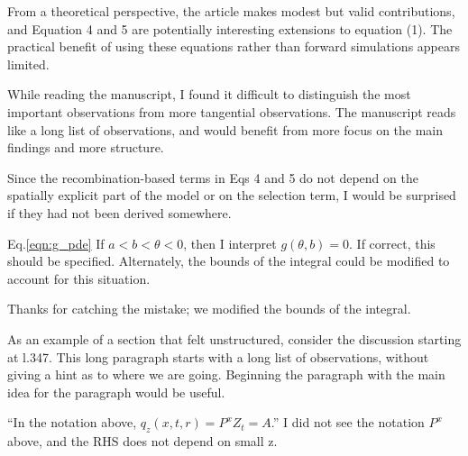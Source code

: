 \begin{point}{}
    From a theoretical perspective, the article makes modest but valid contributions, and  Equation 4 and 5 are potentially interesting extensions to equation (1). The practical benefit of using these equations rather than forward simulations appears limited.
\end{point}

\reply
{}

\begin{point}{}
    While reading the manuscript, I found it difficult to distinguish the most important observations from more tangential observations. The manuscript reads like a long list of observations, and would benefit from more focus on the main findings and more structure.
\end{point}

\reply

\begin{point}{}
Since the recombination-based terms in Eqs 4 and 5 do not depend on the spatially explicit part of the model or on the selection term, I would be surprised if they had not been derived somewhere.
\end{point}

\reply
{}

\begin{point}{Eq.\ref{eqn:g_pde}}
If $a<b<\theta<0$, then I interpret $g(\theta,b) = 0$. If correct, this should be specified.  Alternately, the bounds of the integral could be modified to account for this situation.
\end{point}

\reply
Thanks for catching the mistake; we modified the bounds of the integral.

\begin{point}{}
As an example of a section that felt unstructured, consider the discussion starting at l.347.  This long paragraph starts with a long list of observations, without giving a hint as to where we are going. Beginning the paragraph with the main idea for the paragraph would be useful.
\end{point}

\reply
{}

\begin{point}{\revref}
``In the notation above, $q_z(x, t, r) = P^x{Z_t = A}$.''
I did not see the notation $P^x$ above, and the RHS does not depend on small z.
\end{point}

